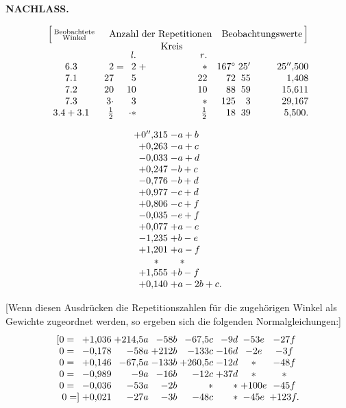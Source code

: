 \par\clearpage
\noindent{}\hfill{\small\textbf{NACHLASS.}}\hfill\null\par\medskip
{\small
\[
\begin{array}{@{}c@{\quad}r@{\;}c@{\;}r@{\;}c@{\;}r@{\quad}r@{\;}r@{\;}r@{}}
 \Bigl[\,\substack{\text{Beobachtete}\\\text{Winkel}}&
 \multicolumn{5}{c}{\text{Anzahl der Repetitionen}}&
 \multicolumn{3}{c@{}}{\text{Beobachtungswerte}\,\Bigr]}\\[-2pt]
 &&&\multicolumn{3}{c}{\text{Kreis}}&&&\\[-3pt]
 &&&\mathit{l.}&&\mathit{r.}&&&\\
 6.3&2&=&2&+&\ast&167^\circ&25'&25''{,}500\\
 7.1&27&&5&&22&72&55&1{,}408\\
 7.2&20&&10&&10&88&59&15{,}611\\
 7.3&3\mathord{\cdot}&&3&&\ast&125&3&29{,}167\\
 3.4+3.1&\frac12&&\mathord{\raisebox{.4ex}{.}}\ast&&\frac12&18&39&5{,}500.
\end{array}
\]
}

{\par}
\[
\begin{array}{@{}r@{\;}l@{}}
 +0''{,}315&-a+b\\
 +0{,}263&-a+c\\
 -0{,}033&-a+d\\
 +0{,}247&-b+c\\
 -0{,}776&-b+d\\
 +0{,}977&-c+d\\
 +0{,}806&-c+f\\
 -0{,}035&-e+f\\
 +0{,}077&+a-e\\
 -1{,}235&+b-e\\
 +1{,}201&+a-f\\
 \makebox[2.4em][c]{\(\ast\)}&\quad\ast\\
 +1{,}555&+b-f\\
 +0{,}140&+a-2b+c.
\end{array}
\]

[Wenn diesen Ausdrücken die Repetitionszahlen für die zugehörigen Winkel als Gewichte zugeordnet werden, so ergeben sich die folgenden Normalgleichungen:]
\[
\begin{array}{@{}r@{\;}r@{\;}r@{\;}r@{\;}r@{\;}r@{\;}c@{\;}c@{}}
 [0=\phantom{]}&+1{,}036&+214{,}5a&-58b&-67{,}5c&-9d&-53e&-27f\\
 0=\phantom{]}&-0{,}178&-58a&+212b&-133c&-16d&-2e&-3f\\
 0=\phantom{]}&+0{,}146&-67{,}5a&-133b&+260{,}5c&-12d&\ast&-48f\\
 0=\phantom{]}&-0{,}989&-9a&-16b&-12c&+37d&\ast&\ast\\
 0=\phantom{]}&-0{,}036&-53a&-2b&\ast&\ast&+100e&-45f\\
 0=]&+0{,}021&-27a&-3b&-48c&\ast&-45e&+123f.
\end{array}
\]

